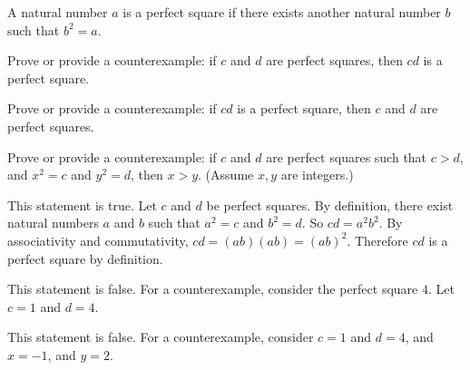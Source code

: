 \documentclass[solution, letterpaper]{cs20}
\begin{document}
A natural number $a$ is a perfect square if there exists another natural number $b$ such that $b^2 = a$.

\subproblem Prove or provide a counterexample: if $c$ and $d$ are perfect squares, then $cd$ is a perfect square.

\subproblem Prove or provide a counterexample: if $cd$ is a perfect square, then $c$ and $d$ are perfect squares.

\subproblem Prove or provide a counterexample: if $c$ and $d$ are perfect squares such that $c > d$, and $x^2 = c$ and $y^2 = d$, then $x > y$. (Assume $x, y$ are integers.)

\begin{solution}

\subsolution This statement is true. Let $c$ and $d$ be perfect squares. By definition, there exist natural numbers $a$ and $b$ such that $a^2 = c$ and $b^2 = d$. So $cd = a^2b^2$. By associativity and commutativity, $cd = (ab)(ab) = (ab)^2$. Therefore $cd$ is a perfect square by definition.

\subsolution This statement is false. For a counterexample, consider the perfect square $4$. Let $c = 1$ and $d = 4$. 

\subsolution This statement is false. For a counterexample, consider $c = 1$ and $d = 4$, and $x = -1$, and $y = 2$.

\end{solution}
\end{document}
